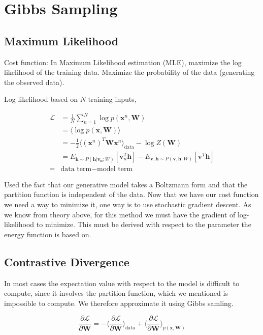 \section{Gibbs Sampling}

\subsection{Maximum Likelihood}

Cost function: 
In Maximum Likelihood estimation (MLE), maximize the log likelihood of the training data.
Maximize the probability of the data (generating the observed data).

Log likelihood based on $N$ training inputs, 

\begin{align}
\mathcal{L} &= \frac{1}{N} \sum_{n=1}^N \log p(\mathbf{x}^n, \mathbf{W}) \\
&= \langle \log p(\mathbf{x}, \mathbf{W}) \rangle \\
&= -\frac{1}{2} \langle (\mathbf{x}^n)^T \mathbf{W} \mathbf{x}^n \rangle_{\text{data}} - \log Z(\mathbf{W}) \\
&= E_{\mathbf{h} \sim P(\mathbf{h}|\mathbf{v_n};W)}[\mathbf{v}_n^T \mathbf{h}] - E_{\mathbf{v}, \mathbf{h} \sim P(\mathbf{v},\mathbf{h};W)}[\mathbf{v}^T \mathbf{h}] \\
=& \text{data term} - \text{model term}
\end{align}

Used the fact that our generative model takes a Boltzmann form and that the partition function is independent of the data. Now that we have our cost function we need a way to minimize it, one way is to use stochastic gradient descent. As we know from theory above, for this method we must have the gradient of log-likelihood to minimize. This must be derived with respect to the parameter the energy function is based on. 

\subsection{Contrastive Divergence}


In most cases the expectation value with respect to the model is difficult to compute, since it involves the partition function, which we mentioned is impossible to compute.
We therefore approximate it using Gibbs samling. 

\begin{equation}
\frac{\partial \mathcal{L}}{\partial \mathbf{W}} = - \langle \frac{\partial \mathcal{L}}{\partial \mathbf{W}} \rangle_{\text{data}} + \langle \frac{\partial \mathcal{L}}{\partial \mathbf{W}} \rangle_{p(\mathbf{x}, \mathbf{W})}
\end{equation}

